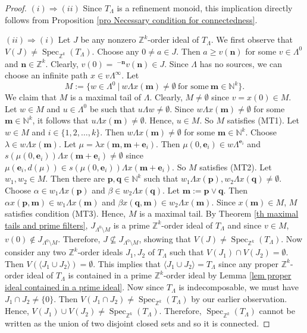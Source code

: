 \documentclass[a4paper,reqno,12pt]{amsart}
\numberwithin{equation}{section}
\theoremstyle{definition}
\theoremstyle{remark}
\newcommand{\Spec}{\operatorname{Spec}}
\newcommand{\N}{\mathbf{n}}
\newcommand{\M}{\mathbf{m}}
\newcommand{\bP}{\mathbf{p}}
\newcommand{\Q}{\mathbf{q}}
\begin{document}
\begin{proof}
$(i)\Rightarrow (ii)$ Since $T_\Lambda$ is a refinement monoid, this implication directly follows from Proposition \ref{pro Necessary condition for connectedness}.

$(ii)\Rightarrow (i)$ Let $J$ be any nonzero $\mathbb{Z}^k$-order ideal of $T_\Lambda$. We first observe that $V(J)\neq \Spec_{\mathbb{Z}^k}(T_\Lambda)$. Choose any $0\neq a\in J$. Then $a\ge v(\N)$ for some $v\in \Lambda^0$ and $\N\in \mathbb{Z}^k$. Clearly, $v(0)=~^{-\N}v(\N)\in J$. Since $\Lambda$ has no sources, we can choose an infinite path $x\in v\Lambda^\infty$. Let \[M:=\{w\in \Lambda^0~|~w\Lambda x(\M)\neq \emptyset~\text{for some}~\M\in \mathbb{N}^k\}.\] We claim that $M$ is a maximal tail of $\Lambda$. Clearly, $M\neq \emptyset$ since $v=x(0)\in M$. Let $w\in M$ and $u\in \Lambda^0$ be such that $u\Lambda w\neq \emptyset$. Since $w\Lambda x(\M)\neq \emptyset$ for some $\M\in \mathbb{N}^k$, it follows that $u\Lambda x(\M)\neq \emptyset$. Hence, $u\in M$. So $M$ satisfies (MT1). Let $w\in M$ and $i\in \{1,2,\ldots,k\}$. Then $w\Lambda x(\M)\neq \emptyset$ for some $\M\in \mathbb{N}^k$. Choose $\lambda\in w\Lambda x(\M)$. Let $\mu=\lambda x(\M,\M+\mathbf{e}_i)$. Then $\mu(0,\mathbf{e}_i)\in w\Lambda^{\mathbf{e}_i}$ and $s(\mu(0,\mathbf{e}_i))\Lambda x(\M+\mathbf{e}_i)\neq \emptyset$ since $\mu(\mathbf{e}_i,d(\mu))\in s(\mu(0,\mathbf{e}_i))\Lambda x(\M+\mathbf{e}_i)$. So $M$ satisfies (MT2). Let $w_1,w_2\in M$. Then there are $\bP,\Q\in \mathbb{N}^k$ such that $w_1\Lambda x(\bP),w_2\Lambda x(\Q)\neq \emptyset$. Choose $\alpha\in w_1\Lambda x(\bP)$ and $\beta\in w_2\Lambda x(\Q)$. Let $\M:=\bP\vee \Q$. Then $\alpha x(\bP,\M)\in w_1\Lambda x(\M)$ and $\beta x(\Q,\M)\in w_2\Lambda x(\M)$. Since $x(\M)\in M$, $M$ satisfies condition (MT3). Hence, $M$ is a maximal tail. By Theorem \ref{th maximal tails and prime filters}, $J_{\Lambda^0\setminus M}$ is a prime $\mathbb{Z}^k$-order ideal of $T_\Lambda$ and since $v\in M$, $v(0)\notin J_{\Lambda^0\setminus M}$. Therefore, $J\nsubseteq J_{\Lambda^0\setminus M}$, showing that $V(J)\neq \Spec_{\mathbb{Z}^k}(T_\Lambda)$. Now consider any two $\mathbb{Z}^k$-order ideals $J_1,J_2$ of $T_\Lambda$ such that $V(J_1)\cap V(J_2)=\emptyset$. Then $V\left(\langle J_1 \cup J_2\rangle \right)=\emptyset$. This implies that $\langle J_1 \cup J_2\rangle=T_\Lambda$ since any proper $\mathbb{Z}^k$-order ideal of $T_\Lambda$ is contained in a prime $\mathbb{Z}^k$-order ideal by Lemma \ref{lem proper ideal contained in a prime ideal}. Now since $T_\Lambda$ is indecomposable, we must have $J_1\cap J_2\neq \{0\}$. Then $V(J_1\cap J_2)\neq \Spec_{\mathbb{Z}^k}(T_\Lambda)$ by our earlier observation. Hence, $V(J_1)\cup V(J_2)\neq \Spec_{\mathbb{Z}^k}(T_\Lambda)$. Therefore, $\Spec_{\mathbb{Z}^k}(T_\Lambda)$ cannot be written as the union of two disjoint closed sets and so it is connected.


\end{proof}
\end{document}
